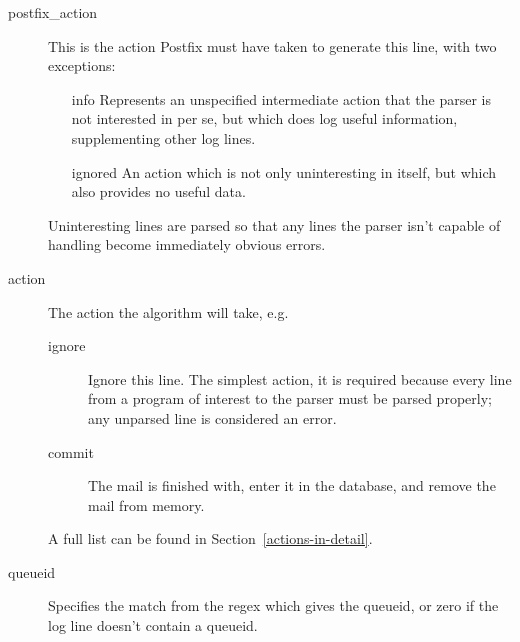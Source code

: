 \documentclass[a4paper,12pt,draft]{article}
\begin{document}
\begin{description}
    \item [postfix\_action] This is the action Postfix must have taken to
        generate this line, with two exceptions:

        \begin{itemize}

            \item [info] Represents an unspecified intermediate action that
                the parser is not interested in per se, but which does log
                useful information, supplementing other log lines.

            \item [ignored] An action which is not only uninteresting in
                itself, but which also provides no useful data.

        \end{itemize}

        Uninteresting lines are parsed so that any lines the parser isn't
        capable of handling become immediately obvious errors.

    \item [action] The action the algorithm will take, e.g.
        \begin{description}

            \item [ignore] Ignore this line.  The simplest action, it is
                required because every line from a program of interest to
                the parser must be parsed properly; any unparsed line is
                considered an error.

            \item [commit] The mail is finished with, enter it in the
                database, and remove the mail from memory.

        \end{description}

        A full list can be found in Section~\ref{actions-in-detail}.

    \item [queueid] Specifies the match from the regex which gives the
        queueid, or zero if the log line doesn't contain a queueid.


\end{description}
\end{document}
